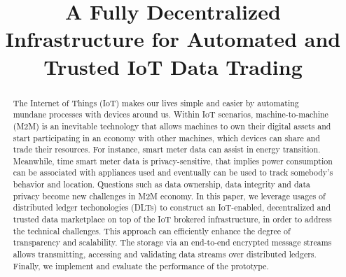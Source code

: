 \documentclass[conference]{IEEEtran}
\begin{document}
\title{A Fully Decentralized Infrastructure for Automated and Trusted IoT Data Trading}

\author{
\and
{}
\and
{}
}

\maketitle


\begin{abstract} 
The Internet of Things (IoT) makes our lives simple and easier by automating mundane processes with devices around us. Within IoT scenarios, machine-to-machine (M2M) is an inevitable technology that allows machines to own their digital assets and start participating in an economy with other machines, which devices can share and trade their resources. For instance, smart meter data can assist in energy transition. Meanwhile, time smart meter data is privacy-sensitive, that implies power consumption can be associated with appliances used and eventually can be used to track somebody's behavior and location. Questions such as data ownership, data integrity and data privacy become new challenges in M2M economy. In this paper, we leverage usages of distributed ledger techonologies (DLTs) to construct an IoT-enabled, decentralized and trusted data marketplace on top of the IoT brokered infrastructure, in order to address the technical challenges. This approach can efficiently enhance the degree of transparency and scalability. The storage via an end-to-end encrypted message streams allows transmitting, accessing and validating data streams over distributed ledgers. Finally, we implement and evaluate the performance of the prototype.
\end{abstract}
\end{document}
